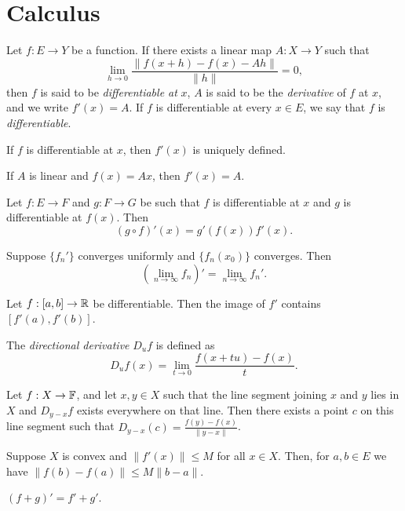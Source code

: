 \section{Calculus}
\begin{defn}
    Let $f:E\to Y$ be a function. If there exists a linear map $A:X\to Y$ such that
    \[\lim_{h\to 0}\frac{\|f(x+h)-f(x)-Ah\|}{\|h\|}=0,\]
    then $f$ is said to be \emph{differentiable at} $x$, $A$ is said to be the
    \emph{derivative} of $f$ at $x$, and we write $f'(x)=A$.
    If $f$ is differentiable at every $x\in E$, we say that $f$ is
    \emph{differentiable}.
\end{defn}
\begin{prop}
    If $f$ is differentiable at $x$, then $f'(x)$ is uniquely defined.
\end{prop}
\begin{prop}
    If $A$ is linear and $f(x)=Ax$, then $f'(x)=A$.
\end{prop}
\begin{prop}
    Let $f:E\to F$ and $g:F\to G$ be such that $f$ is differentiable at $x$ and $g$
    is differentiable at $f(x)$. Then \[(g\circ f)'(x)=g'(f(x))f'(x).\]
\end{prop}
\begin{prop}
    Suppose $\{f_n'\}$ converges uniformly and $\{f_n(x_0)\}$ converges. Then
    \[\left(\lim_{n\to\infty} f_n\right)'=\lim_{n\to\infty} f_n'.\]
\end{prop}
\begin{prop}
    Let $f:[a,b]\to\mathbb{R}$ be differentiable. Then the image of $f'$ contains
    $[f'(a),f'(b)]$.
\end{prop}
\begin{defn}
    The \emph{directional derivative} $D_u f$ is defined as
    \[D_u f(x)=\lim_{t\to 0}\frac{f(x+tu)-f(x)}{t}.\]
\end{defn}
\begin{prop}
    Let $f:X\to\mathbb{F}$, and let $x,y\in X$ such that the line
    segment joining $x$ and $y$ lies in $X$ and $D_{y-x}f$ exists everywhere on
    that line. Then there exists a point $c$ on
    this line segment such that $D_{y-x}(c)=\frac{f(y)-f(x)}{\|y-x\|}$.
\end{prop}
\begin{prop}
    Suppose $X$ is convex and $\|f'(x)\|\le M$ for all $x\in X$. Then, for $a,b\in E$ we have
    $\|f(b)-f(a)\|\le M\|b-a\|$.
\end{prop}
\begin{prop}
    $(f+g)'=f'+g'$.
\end{prop}
